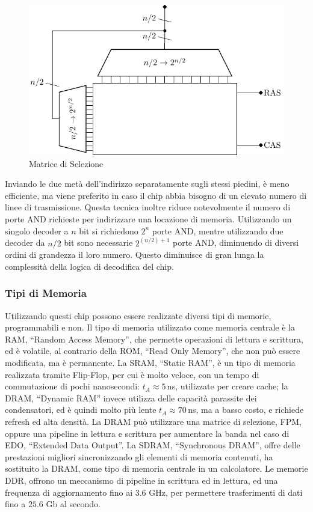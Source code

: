 \documentclass{article}
\numberwithin{equation}{subsection}
\begin{document}
\begin{figure}[H]%
    \centering%
    \includegraphics{matrice-selezione.pdf}%
    \caption{Matrice di Selezione}%
\end{figure}

Inviando le due metà dell'indirizzo separatamente sugli stessi piedini, è meno efficiente, ma viene preferito in caso il chip abbia bisogno di un elevato numero di linee di trasmissione. Questa tecnica inoltre 
riduce notevolmente il numero di porte AND richieste per indirizzare una locazione di memoria. Utilizzando un singolo decoder a $n$ bit si richiedono $2^n$ porte AND, mentre utilizzando due decoder da $n/2$ bit 
sono necessarie $2^{(n/2)+1}$ porte AND, diminuendo di diversi ordini di grandezza il loro numero. Questo diminuisce di gran lunga la complessità della logica di decodifica del chip. 

\subsubsection{Tipi di Memoria}

Utilizzando questi chip possono essere realizzate diversi tipi di memorie, programmabili e non. Il tipo di memoria utilizzato come memoria centrale è la RAM, ``Random Access Memory'', che permette operazioni di 
lettura e scrittura, ed è volatile, al contrario della ROM, ``Read Only Memory'', che non può essere modificata, ma è permanente.  
La SRAM, ``Static RAM'', è un tipo di memoria realizzata tramite Flip-Flop, per cui è molto veloce, con un tempo di commutazione di pochi nanosecondi: $t_A\approx5\,$ns, utilizzate 
per creare cache; la DRAM, ``Dynamic RAM'' invece utilizza delle capacità 
parassite dei condensatori, ed è quindi molto più lente $t_A\approx70\,$ns, ma a basso costo, e richiede refresh ed alta densità. La DRAM può utilizzare una matrice di selezione, FPM, oppure una pipeline in 
lettura e scrittura per aumentare la banda nel caso di EDO, ``Extended Data Output''. 
La SDRAM, ``Synchronous DRAM'', offre delle prestazioni migliori sincronizzando gli elementi di memoria contenuti, ha sostituito la DRAM, come tipo di memoria centrale in un calcolatore. 
Le memorie DDR, offrono un meccanismo di pipeline in scrittura ed in lettura, ed una frequenza di aggiornamento fino ai $3.6$ GHz, per permettere trasferimenti di dati fino a $25.6$ Gb al secondo. 
\end{document}

